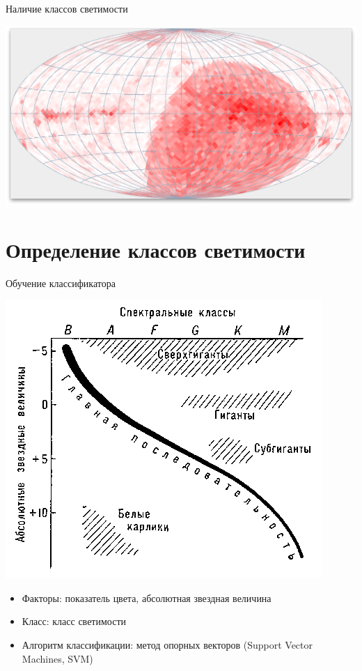 \documentclass[14pt, fleqn, xcolor={dvipsnames, table}]{beamer}
\begin{document}
        \begin{frame}{Наличие классов светимости}
            \begin{center}
                \includegraphics[scale=0.32]{count-white.png}
            \end{center}             
        \end{frame}

    \section{Определение классов светимости}                
        
        \begin{frame}{Обучение классификатора}
            \begin{center}
                \includegraphics[scale=0.25]{gr-example.jpg}
            \end{center}
           
            \begin{itemize}
                \item Факторы: показатель цвета, абсолютная звездная величина
                \item Класс: класс светимости
                \item Алгоритм классификации: метод опорных векторов (Support Vector Machines, SVM)
            \end{itemize}
        \end{frame}        
        
\end{document}
